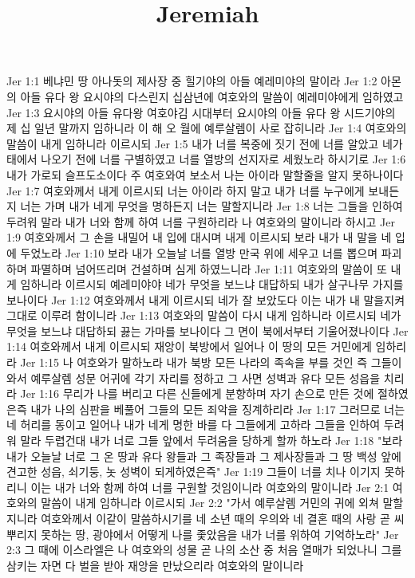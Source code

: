 

\title{Jeremiah}

Jer 1:1  베냐민 땅 아나돗의 제사장 중 힐기야의 아들 예레미야의 말이라
Jer 1:2  아몬의 아들 유다 왕 요시야의 다스린지 십삼년에 여호와의 말씀이 예레미야에게 임하였고
Jer 1:3  요시야의 아들 유다왕 여호야김 시대부터 요시야의 아들 유다 왕 시드기야의 제 십 일년 말까지 임하니라 이 해 오 월에 예루살렘이 사로 잡히니라
Jer 1:4  여호와의 말씀이 내게 임하니라 이르시되
Jer 1:5  내가 너를 복중에 짓기 전에 너를 알았고 네가 태에서 나오기 전에 너를 구별하였고 너를 열방의 선지자로 세웠노라 하시기로
Jer 1:6  내가 가로되 슬프도소이다 주 여호와여 보소서 나는 아이라 말할줄을 알지 못하나이다
Jer 1:7  여호와께서 내게 이르시되 너는 아이라 하지 말고 내가 너를 누구에게 보내든지 너는 가며 내가 네게 무엇을 명하든지 너는 말할지니라
Jer 1:8  너는 그들을 인하여 두려워 말라 내가 너와 함께 하여 너를 구원하리라 나 여호와의 말이니라 하시고
Jer 1:9  여호와께서 그 손을 내밀어 내 입에 대시며 내게 이르시되 보라 내가 내 말을 네 입에 두었노라
Jer 1:10  보라 내가 오늘날 너를 열방 만국 위에 세우고 너를 뽑으며 파괴하며 파멸하며 넘어뜨리며 건설하며 심게 하였느니라
Jer 1:11  여호와의 말씀이 또 내게 임하니라 이르시되 예레미야야 네가 무엇을 보느냐 대답하되 내가 살구나무 가지를 보나이다
Jer 1:12  여호와께서 내게 이르시되 네가 잘 보았도다 이는 내가 내 말을지켜 그대로 이루려 함이니라
Jer 1:13  여호와의 말씀이 다시 내게 임하니라 이르시되 네가 무엇을 보느냐 대답하되 끓는 가마를 보나이다 그 면이 북에서부터 기울어졌나이다
Jer 1:14  여호와께서 내게 이르시되 재앙이 북방에서 일어나 이 땅의 모든 거민에게 임하리라
Jer 1:15  나 여호와가 말하노라 내가 북방 모든 나라의 족속을 부를 것인 즉 그들이 와서 예루살렘 성문 어귀에 각기 자리를 정하고 그 사면 성벽과 유다 모든 성읍을 치리라
Jer 1:16  무리가 나를 버리고 다른 신들에게 분향하며 자기 손으로 만든 것에 절하였은즉 내가 나의 심판을 베풀어 그들의 모든 죄악을 징계하리라
Jer 1:17  그러므로 너는 네 허리를 동이고 일어나 내가 네게 명한 바를 다 그들에게 고하라 그들을 인하여 두려워 말라 두렵건대 내가 너로 그들 앞에서 두려움을 당하게 할까 하노라
Jer 1:18  "보라 내가 오늘날 너로 그 온 땅과 유다 왕들과 그 족장들과 그 제사장들과 그 땅 백성 앞에 견고한 성읍, 쇠기둥, 놋 성벽이 되게하였은즉"
Jer 1:19  그들이 너를 치나 이기지 못하리니 이는 내가 너와 함께 하여 너를 구원할 것임이니라 여호와의 말이니라
Jer 2:1  여호와의 말씀이 내게 임하니라 이르시되
Jer 2:2  "가서 예루살렘 거민의 귀에 외쳐 말할지니라 여호와께서 이같이 말씀하시기를 네 소년 때의 우의와 네 결혼 때의 사랑 곧 씨 뿌리지 못하는 땅, 광야에서 어떻게 나를 좇았음을 내가 너를 위하여 기억하노라"
Jer 2:3  그 때에 이스라엘은 나 여호와의 성물 곧 나의 소산 중 처음 열매가 되었나니 그를 삼키는 자면 다 벌을 받아 재앙을 만났으리라 여호와의 말이니라
